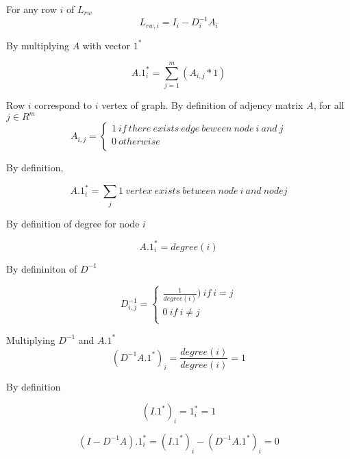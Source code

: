 \documentclass[a4paper]{article}
\begin{document}
For any row $i$ of $L_{rw}$
\begin{equation}
L_{rw,i} = I_{i} - D^{-1}_{i}A_{i}
\end{equation}


By multiplying $A$ with vector $1^{*}$

\begin{equation}
A.1^{*}_{i} = \sum_{j=1}^{m}(A_{i,j} * 1)
\end{equation}

Row $i$ correspond to $i$ vertex of graph. By definition of adjency matrix $A$, for all $j \in R^{m}$
\begin{equation}
A_{i,j} = \begin{cases}
1\ if\ there\ exists\ edge\ beween\ node\ i\ and\ j\\
0\ otherwise\\
\end{cases}
\end{equation}

By definition,

\begin{equation}
A.1^{*}_{i} = \sum_{j} 1\ vertex\ exists\ between\ node\ i\ and\ node j
\end{equation}

By definition of degree for node $i$

\begin{equation}
A.1^{*}_{i} = degree(i)
\end{equation}

By defininiton of $D^{-1}$

\begin{equation}
D^{-1}_{i,j}= \begin{cases}
\frac{1}{degree(i)})\ if\ i=j\\
0\ if\ i \ne j\\
\end{cases}
\end{equation}

Multiplying $D^{-1}$ and $A.1^{*}$
\begin{equation}
(D^{-1}A.1^{*})_{i} = \frac{degree(i)}{degree(i)} = 1 
\end{equation}

By definition

\begin{equation}
(I.1^{*})_{i} = 1^{*}_{i} = 1  
\end{equation}


\begin{equation}
(I - D^{-1}A).1^{*}_{i} = (I.1^{*})_{i} - (D^{-1}A.1^{*})_{i} = 0  
\end{equation}
\end{document}
